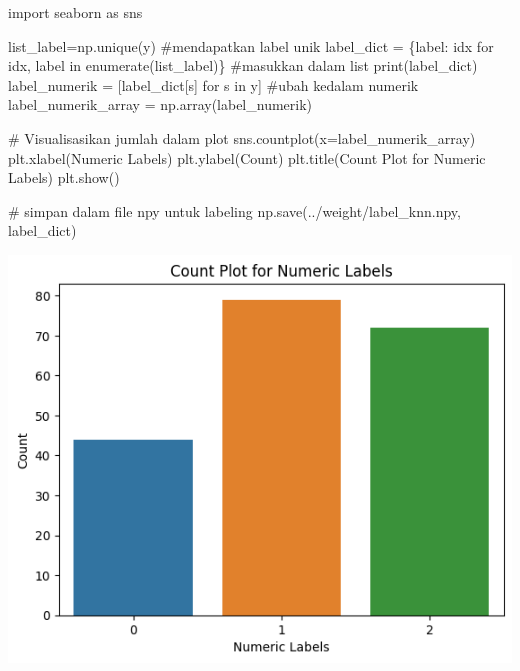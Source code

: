 \documentclass[
  letterpaper,
  DIV=11,
  numbers=noendperiod]{scrreprt}
\newenvironment{Shaded}{\begin{snugshade}}{\end{snugshade}}
\newcommand{\BuiltInTok}[1]{\textcolor[rgb]{0.00,0.23,0.31}{#1}}
\newcommand{\CommentTok}[1]{\textcolor[rgb]{0.37,0.37,0.37}{#1}}
\newcommand{\ControlFlowTok}[1]{\textcolor[rgb]{0.00,0.23,0.31}{#1}}
\newcommand{\ImportTok}[1]{\textcolor[rgb]{0.00,0.46,0.62}{#1}}
\newcommand{\KeywordTok}[1]{\textcolor[rgb]{0.00,0.23,0.31}{#1}}
\newcommand{\NormalTok}[1]{\textcolor[rgb]{0.00,0.23,0.31}{#1}}
\newcommand{\OperatorTok}[1]{\textcolor[rgb]{0.37,0.37,0.37}{#1}}
\newcommand{\StringTok}[1]{\textcolor[rgb]{0.13,0.47,0.30}{#1}}
\begin{document}
\begin{Shaded}
\begin{Highlighting}[]
\ImportTok{import}\NormalTok{ seaborn }\ImportTok{as}\NormalTok{ sns }

\NormalTok{list\_label}\OperatorTok{=}\NormalTok{np.unique(y) }\CommentTok{\#mendapatkan label unik}
\NormalTok{label\_dict }\OperatorTok{=}\NormalTok{ \{label: idx }\ControlFlowTok{for}\NormalTok{ idx, label }\KeywordTok{in} \BuiltInTok{enumerate}\NormalTok{(list\_label)\} }\CommentTok{\#masukkan dalam list}
\BuiltInTok{print}\NormalTok{(label\_dict)}
\NormalTok{label\_numerik }\OperatorTok{=}\NormalTok{ [label\_dict[s] }\ControlFlowTok{for}\NormalTok{ s }\KeywordTok{in}\NormalTok{ y] }\CommentTok{\#ubah kedalam numerik}
\NormalTok{label\_numerik\_array }\OperatorTok{=}\NormalTok{ np.array(label\_numerik)}

\CommentTok{\# Visualisasikan jumlah dalam plot}
\NormalTok{sns.countplot(x}\OperatorTok{=}\NormalTok{label\_numerik\_array)}
\NormalTok{plt.xlabel(}\StringTok{\textquotesingle{}Numeric Labels\textquotesingle{}}\NormalTok{)}
\NormalTok{plt.ylabel(}\StringTok{\textquotesingle{}Count\textquotesingle{}}\NormalTok{)}
\NormalTok{plt.title(}\StringTok{\textquotesingle{}Count Plot for Numeric Labels\textquotesingle{}}\NormalTok{)}
\NormalTok{plt.show()  }

\CommentTok{\# simpan dalam file npy untuk labeling}
\NormalTok{np.save(}\StringTok{\textquotesingle{}../weight/label\_knn.npy\textquotesingle{}}\NormalTok{, label\_dict)}
\end{Highlighting}
\end{Shaded}

\includegraphics{Asset/plothaarknn.png}
\end{document}
